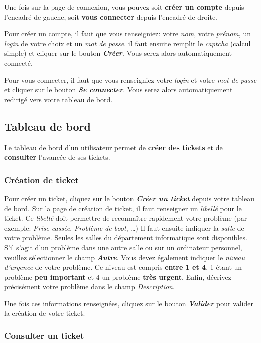 \documentclass[12pt, a4paper]{article}
\begin{document}
\noindent Une fois sur la page de connexion, vous pouvez soit \textbf{créer un compte} depuis l'encadré de gauche,
soit \textbf{vous connecter} depuis l'encadré de droite.

Pour créer un compte, il faut que vous renseigniez: votre \textit{nom}, votre \textit{prénom}, un \textit{login} de votre choix et un \textit{mot de passe}. 
il faut ensuite remplir le \textit{captcha} (calcul simple) et cliquer sur le bouton \textit{\textbf{Créer}}.
Vous serez alors automatiquement connecté.

\bigskip
Pour vous connecter, il faut que vous renseigniez votre \textit{login} et votre \textit{mot de passe} et cliquer sur le bouton \textit{\textbf{Se connecter}}.
Vous serez alors automatiquement redirigé vers votre tableau de bord.

\subsection*{Tableau de bord}

Le tableau de bord d'un utilisateur permet de \textbf{créer des tickets} et de \textbf{consulter} l'avancée de ses tickets.

\subsubsection*{Création de ticket}

Pour créer un ticket, cliquez sur le bouton \textit{\textbf{Créer un ticket}} depuis votre tableau de bord.
Sur la page de création de ticket, il faut renseigner un \textit{libellé} pour le ticket.
Ce \textit{libellé} doit permettre de reconnaître rapidement votre problème (par exemple: \textit{Prise cassée}, \textit{Problème de boot}, \ldots)
Il faut ensuite indiquer la \textit{salle} de votre problème.
Seules les salles du département informatique sont disponibles.
S'il s'agit d'un problème dans une autre salle ou sur un ordinateur personnel, veuillez sélectionner le champ \textit{\textbf{Autre}}.
Vous devez également indiquer le \textit{niveau d'urgence} de votre problème.
Ce niveau est compris \textbf{entre 1 et 4}, 1 étant un problème \textbf{peu important} et 4 un problème \textbf{très urgent}.
Enfin, décrivez précisément votre problème dans le champ \textit{Description}.

\bigskip
\noindent Une fois ces informations renseignées, cliquez sur le bouton \textit{\textbf{Valider}} pour valider la création de votre ticket.

\subsubsection*{Consulter un ticket}
\end{document}
